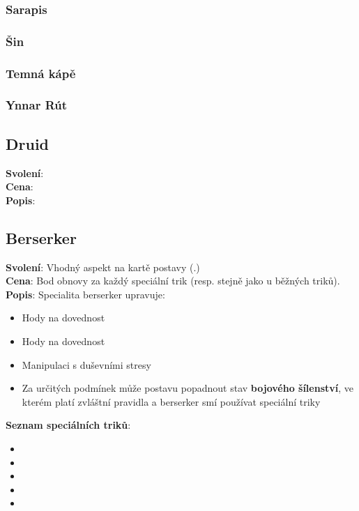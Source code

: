 \subsubsection{Sarapis}
\label{sec:sarapis}

\subsubsection{Šin}
\label{sec:sin}

\subsubsection{Temná kápě}
\label{sec:temna-kap}

\subsubsection{Ynnar Rút}
\label{sec:ynnar-rut}


\begin{tcolorbox}
  
\subsection{Druid}
\label{sec:pov-druid}
\textbf{Svolení}:\\
\textbf{Cena}:\\
\textbf{Popis}:\\

\end{tcolorbox}

\begin{tcolorbox}
\subsection{Berserker}
\label{sec:berserker}
\textbf{Svolení}: Vhodný aspekt na kartě postavy (.)\\
\textbf{Cena}: Bod obnovy za každý speciální trik (resp. stejně jako u běžných triků).\\
\textbf{Popis}: Specialita berserker upravuje:
\begin{itemize}
    \item Hody na dovednost 
    \item Hody na dovednost 
    \item Manipulaci s duševními stresy
    \item Za určitých podmínek může postavu popadnout stav \textbf{bojového šílenství}, ve kterém platí zvláštní pravidla a berserker smí používat speciální triky
\end{itemize}
\textbf{Seznam speciálních triků}:
\begin{itemize}
    \item {}
    \item {}
    \item {}
    \item {}
    \item {}
\end{itemize}
\end{tcolorbox}

